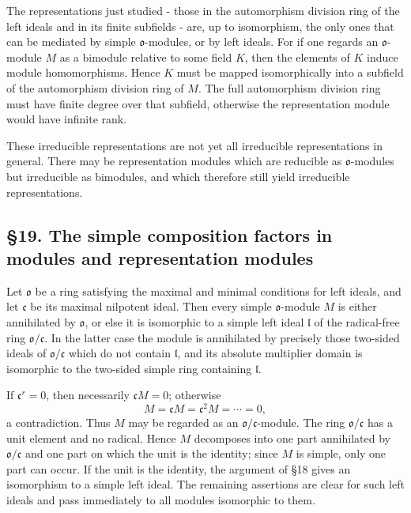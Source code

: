\documentclass[
  11pt,
]{article}
\begin{document}
The representations just studied - those in the automorphism division
ring of the left ideals and in its finite subfields - are, up to
isomorphism, the only ones that can be mediated by simple
\(\mathfrak{o}\)-modules, or by left ideals. For if one regards an
\(\mathfrak{o}\)-module \(M\) as a bimodule relative to some field
\(K\), then the elements of \(K\) induce module homomorphisms. Hence
\(K\) must be mapped isomorphically into a subfield of the automorphism
division ring of \(M\). The full automorphism division ring must have
finite degree over that subfield, otherwise the representation module
would have infinite rank.

These irreducible representations are not yet all irreducible
representations in general. There may be representation modules which
are reducible as \(\mathfrak{o}\)-modules but irreducible as bimodules,
and which therefore still yield irreducible representations.

\subsection{§19. The simple composition factors in modules and
representation
modules}\label{the-simple-composition-factors-in-modules-and-representation-modules}

Let \(\mathfrak{o}\) be a ring satisfying the maximal and minimal
conditions for left ideals, and let \(\mathfrak c\) be its maximal
nilpotent ideal. Then every simple \(\mathfrak{o}\)-module \(M\) is
either annihilated by \(\mathfrak{o}\), or else it is isomorphic to a
simple left ideal \(\mathfrak l\) of the radical-free ring
\(\mathfrak{o}/\mathfrak c\). In the latter case the module is
annihilated by precisely those two-sided ideals of
\(\mathfrak{o}/\mathfrak c\) which do not contain \(\mathfrak l\), and
its absolute multiplier domain is isomorphic to the two-sided simple
ring containing \(\mathfrak l\).

If \(\mathfrak c^r=0\), then necessarily \(\mathfrak cM=0\); otherwise
\[
  M=\mathfrak cM=\mathfrak c^2M=\cdots=0,
\] a contradiction. Thus \(M\) may be regarded as an
\(\mathfrak{o}/\mathfrak c\)-module. The ring
\(\mathfrak{o}/\mathfrak c\) has a unit element and no radical. Hence
\(M\) decomposes into one part annihilated by
\(\mathfrak{o}/\mathfrak c\) and one part on which the unit is the
identity; since \(M\) is simple, only one part can occur. If the unit is
the identity, the argument of §18 gives an isomorphism to a simple left
ideal. The remaining assertions are clear for such left ideals and pass
immediately to all modules isomorphic to them.
\end{document}
